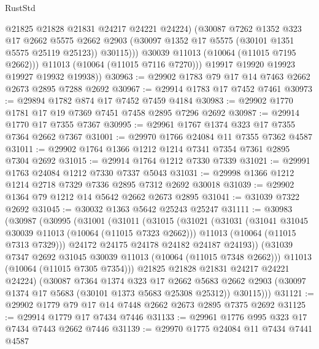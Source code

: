 \begin{lexlean}{RustStd}
\begin{coremodule}
                  @21825
                  @21828
                  @21831
                  @24217
                  @24221
                  @24224)
                (@30087
                  @7262
                  @1352
                  @323
                  @17
                  @2662
                  @5575
                  @2662
                  @2903
                  (@30097 @1352 @17 @5575 (@30101 @1351 @5575 @25119 @25123))
                  @30115)))
            @30039
            @11013
            (@10064 (@11015 @7195 @2662)))
          @11013
          (@10064 (@11015 @7116 @7270)))
        @19917
        @19920
        @19923
        @19927
        @19932
        @19938))
@30963 := @29902 @1783 @79 @17 @14 @7463 @2662 @2673 @2895 @7288 @2692
@30967 := @29914 @1783 @17 @7452 @7461
@30973 := @29894 @1782 @874 @17 @7452 @7459 @4184
@30983 := @29902 @1770 @1781 @17 @19 @7369 @7451 @7458 @2895 @7296 @2692
@30987 := @29914 @1770 @17 @7355 @7367
@30995 := @29961 @1767 @1374 @323 @17 @7355 @7364 @2662 @7367
@31001 := @29970 @1766 @24084 @11 @7355 @7362 @4587
@31011 := @29902 @1764 @1366 @1212 @1214 @7341 @7354 @7361 @2895 @7304 @2692
@31015 := @29914 @1764 @1212 @7330 @7339
@31021 := @29991 @1763 @24084 @1212 @7330 @7337 @5043
@31031 := @29998 @1366 @1212 @1214 @2718 @7329 @7336 @2895 @7312 @2692 @30018
@31039 := @29902 @1364 @79 @1212 @14 @5642 @2662 @2673 @2895
@31041 := @31039 @7322 @2692
@31045 := @30032 @1363 @5642 @25243 @25247
@31111 := @30983
    (@30987
      (@30995
        (@31001
          (@31011
            (@31015
              (@31021
                (@31031
                  (@31041 @31045 @30039 @11013 (@10064 (@11015 @7323 @2662)))
                  @11013
                  (@10064 (@11015 @7313 @7329)))
                @24172
                @24175
                @24178
                @24182
                @24187
                @24193))
            (@31039 @7347 @2692 @31045 @30039 @11013 (@10064 (@11015 @7348 @2662)))
            @11013
            (@10064 (@11015 @7305 @7354)))
          @21825
          @21828
          @21831
          @24217
          @24221
          @24224)
        (@30087
          @7364
          @1374
          @323
          @17
          @2662
          @5683
          @2662
          @2903
          (@30097 @1374 @17 @5683 (@30101 @1373 @5683 @25308 @25312))
          @30115)))
@31121 := @29902 @1779 @79 @17 @14 @7448 @2662 @2673 @2895 @7375 @2692
@31125 := @29914 @1779 @17 @7434 @7446
@31133 := @29961 @1776 @995 @323 @17 @7434 @7443 @2662 @7446
@31139 := @29970 @1775 @24084 @11 @7434 @7441 @4587

\end{coremodule}
\end{lexlean}
